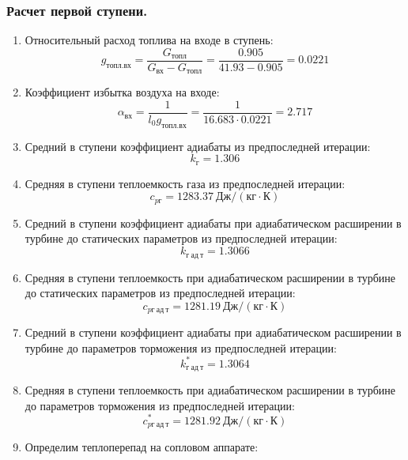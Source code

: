 \documentclass[a4paper,12pt]{article}
\begin{document}
    \subsubsection{Расчет первой ступени.}
%    
    \begin{enumerate}

        \item Относительный расход топлива на входе в ступень:
        \[
            g_{топл.вх} = \frac{ G_{топл} }{ G_{вх} - G_{топл} } =
                \frac{ 0.905 }{ 41.93 - 0.905 } =
            0.0221
        \]

        \item Коэффициент избытка воздуха на входе:
        \[
            \alpha_{вх} = \frac{ 1 }{ l_0 g_{топл.вх} } =
                \frac{ 1 }{ 16.683 \cdot 0.0221 } =
            2.717
        \]

        \item Средний в ступени коэффициент адиабаты из предпоследней итерации:
        \[
            k_г = 1.306
        \]

        \item Средняя в ступени теплоемкость газа из предпоследней итерации:
        \[
            c_{pг} = 1283.37 \ Дж/(кг \cdot К)
        \]

        \item Средний в ступени коэффициент адиабаты при адиабатическом расширении в турбине до статических параметров из предпоследней итерации:
        \[
            k_{г\ ад\ т} = 1.3066
        \]

        \item Средняя в ступени теплоемкость при адиабатическом расширении в турбине до статических параметров из предпоследней итерации:
        \[
            c_{pг\ ад\ т} = 1281.19 \ Дж/(кг \cdot К)
        \]

        \item Средний в ступени коэффициент адиабаты при адиабатическом расширении в турбине до параметров торможения из предпоследней итерации:
        \[
            k_{г\ ад\ т}^* = 1.3064
        \]

        \item Средняя в ступени теплоемкость при адиабатическом расширении в турбине до параметров торможения из предпоследней итерации:
        \[
            c_{pг\ ад\ т}^* = 1281.92 \ Дж/(кг \cdot К)
        \]

        
        

        

        \item Определим теплоперепад на сопловом аппарате:


\end{enumerate}
\end{document}
